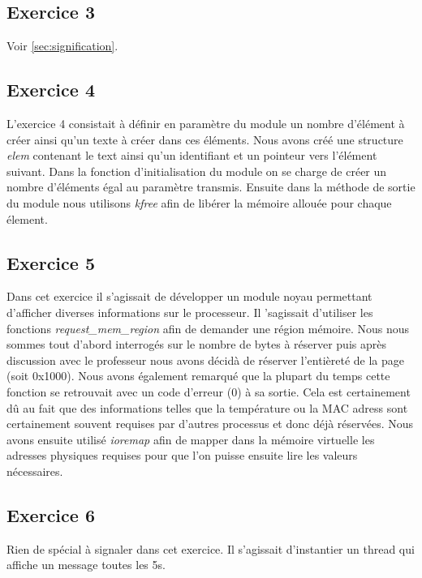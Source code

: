 \documentclass{ReportTemplate}
\begin{document}
\subsection{Exercice 3}
Voir \ref{sec:signification}.
\subsection{Exercice 4}
L'exercice 4 consistait à définir en paramètre du module un nombre d'élément à
créer ainsi qu'un texte à créer dans ces éléments. Nous avons créé une structure
\textit{elem} contenant le text ainsi qu'un identifiant et un pointeur vers
l'élément suivant. Dans la fonction d'initialisation du module on se charge de
créer un nombre d'éléments égal au paramètre transmis. Ensuite dans la méthode
de sortie du module nous utilisons \textit{kfree} afin de libérer la mémoire
allouée pour chaque élement.
\subsection{Exercice 5}
Dans cet exercice il s'agissait de développer un module noyau permettant
d'afficher diverses informations sur le processeur. Il 'sagissait d'utiliser les
fonctions \textit{request\_mem\_region} afin de demander une région mémoire.
Nous nous sommes tout d'abord interrogés sur le nombre de bytes à réserver puis
après discussion avec le professeur nous avons décidà de réserver l'entièreté de
la page (soit 0x1000). Nous avons également remarqué que la plupart du temps
cette fonction se retrouvait avec un code d'erreur (0) à sa sortie. Cela est
certainement dû au fait que des informations telles que la température ou la MAC
adress sont certainement souvent requises par d'autres processus et donc déjà
réservées. Nous avons ensuite utilisé \textit{ioremap} afin de mapper dans la
mémoire virtuelle les adresses physiques requises pour que l'on puisse ensuite
lire les valeurs nécessaires.
\subsection{Exercice 6}
Rien de spécial à signaler dans cet exercice. Il s'agissait d'instantier un
thread qui affiche un message toutes les 5s.
\end{document}
